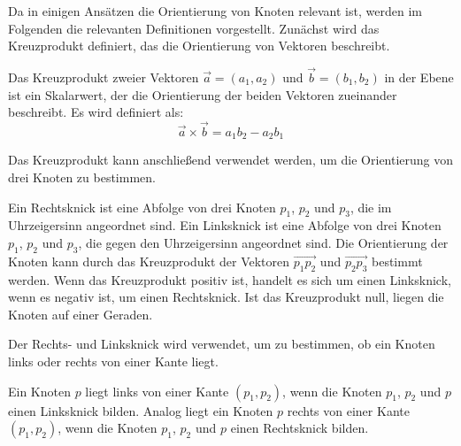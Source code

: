 Da in einigen Ansätzen die Orientierung von Knoten relevant ist, werden im Folgenden die relevanten Definitionen vorgestellt.
Zunächst wird das Kreuzprodukt definiert, das die Orientierung von Vektoren beschreibt.
\begin{definition}[Kreuzprodukt]
    Das Kreuzprodukt zweier Vektoren \(\overrightarrow{a} = (a_1, a_2)\) und \(\overrightarrow{b} = (b_1, b_2)\) in der Ebene ist ein Skalarwert, der die Orientierung der beiden Vektoren zueinander beschreibt.
    Es wird definiert als:
    \[
    \overrightarrow{a} \times \overrightarrow{b} = a_1 b_2 - a_2 b_1
    \]
\end{definition}

Das Kreuzprodukt kann anschließend verwendet werden, um die Orientierung von drei Knoten zu bestimmen.
\begin{definition}
    Ein Rechtsknick ist eine Abfolge von drei Knoten \(p_1\), \(p_2\) und \(p_3\), die im Uhrzeigersinn angeordnet sind.
    Ein Linksknick ist eine Abfolge von drei Knoten \(p_1\), \(p_2\) und \(p_3\), die gegen den Uhrzeigersinn angeordnet sind.
    Die Orientierung der Knoten kann durch das Kreuzprodukt der Vektoren \(\overrightarrow{p_1p_2}\) und \(\overrightarrow{p_2p_3}\) bestimmt werden.
    Wenn das Kreuzprodukt positiv ist, handelt es sich um einen Linksknick, wenn es negativ ist, um einen Rechtsknick.
    Ist das Kreuzprodukt null, liegen die Knoten auf einer Geraden.
\end{definition}

Der Rechts- und Linksknick wird verwendet, um zu bestimmen, ob ein Knoten links oder rechts von einer Kante liegt.
\begin{definition}
    Ein Knoten \(p\) liegt links von einer Kante \((p_1, p_2)\), wenn die Knoten \(p_1\), \(p_2\) und \(p\) einen Linksknick bilden.
    Analog liegt ein Knoten \(p\) rechts von einer Kante \((p_1, p_2)\), wenn die Knoten \(p_1\), \(p_2\) und \(p\) einen Rechtsknick bilden.
\end{definition}